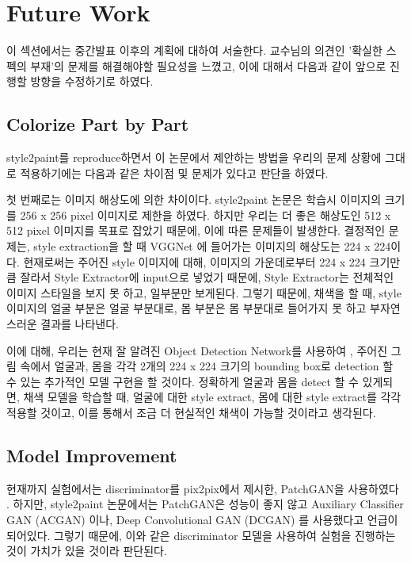 \section{Future Work}

이 섹션에서는 중간발표 이후의 계획에 대하여 서술한다.
교수님의 의견인 '확실한 스펙의 부재'의 문제를 해결해야할 필요성을 느꼈고, 이에 대해서 다음과 같이 앞으로 진행할 방향을 수정하기로 하였다.

\subsection{Colorize Part by Part}

style2paint를 reproduce하면서 이 논문에서 제안하는 방법을 우리의 문제 상황에 그대로 적용하기에는 다음과 같은 차이점 및 문제가 있다고 판단을 하였다.

첫 번째로는 이미지 해상도에 의한 차이이다. style2paint 논문은 학습시 이미지의 크기를 256 x 256 pixel 이미지로 제한을 하였다.
하지만 우리는 더 좋은 해상도인 512 x 512 pixel 이미지를 목표로 잡았기 때문에, 이에 따른 문제들이 발생한다. 결정적인 문제는, style extraction을 할 때 VGGNet \cite{Simonyan2014}에 들어가는 이미지의 해상도는 224 x 224이다.
현재로써는 주어진 style 이미지에 대해, 이미지의 가운데로부터 224 x 224 크기만큼 잘라서 Style Extractor에 input으로 넣었기 때문에, Style Extractor는 전체적인 이미지 스타일을 보지 못 하고, 일부분만 보게된다. 그렇기 때문에, 채색을 할 때, style 이미지의 얼굴 부분은 얼굴 부분대로, 몸 부분은 몸 부분대로 들어가지 못 하고 부자연스러운 결과를 나타낸다.

이에 대해, 우리는 현재 잘 알려진 Object Detection Network를 사용하여 \cite{Ross2015, Ross2014,Kaiming2017, Joseph2016}, 주어진 그림 속에서 얼굴과, 몸을 각각 2개의 224 x 224 크기의 bounding box로 detection 할 수 있는 추가적인 모델 구현을 할 것이다. 정확하게 얼굴과 몸을 detect 할 수 있게되면, 채색 모델을 학습할 때, 얼굴에 대한 style extract, 몸에 대한 style extract를 각각 적용할 것이고, 이를 통해서 조금 더 현실적인 채색이 가능할 것이라고 생각된다.

\subsection{Model Improvement}

현재까지 실험에서는 discriminator를 pix2pix에서 제시한, PatchGAN을 사용하였다 \cite{phillip2017}.
하지만, style2paint 논문에서는 PatchGAN은 성능이 좋지 않고 Auxiliary Classifier GAN (ACGAN) \cite{Odena2017}이나, Deep Convolutional GAN (DCGAN) \cite{Radford2015}를 사용했다고 언급이 되어있다.
그렇기 때문에, 이와 같은 discriminator 모델을 사용하여 실험을 진행하는 것이 가치가 있을 것이라 판단된다.

